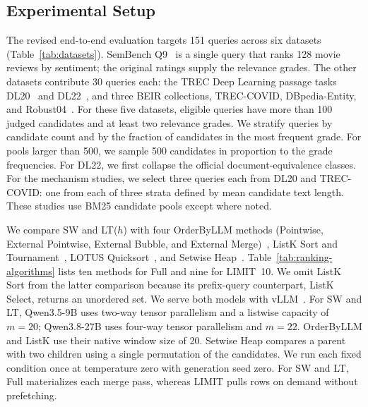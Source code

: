 \subsection{Experimental Setup}
\label{sec:exp:setup}

The revised end-to-end evaluation targets 151 queries across six datasets (Table~\ref{tab:datasets}). SemBench Q9~\cite{lao2026sembench} is a single query that ranks 128 movie reviews by sentiment; the original ratings supply the relevance grades. The other datasets contribute 30 queries each: the TREC Deep Learning passage tasks DL20~\cite{arxiv21trecdl20} and DL22~\cite{arxiv25trecdl22}, and three BEIR collections, TREC-COVID, DBpedia-Entity, and Robust04~\cite{arxiv21BEIR}.
For these five datasets, eligible queries have more than 100 judged candidates and at least two relevance grades. We stratify queries by candidate count and by the fraction of candidates in the most frequent grade. For pools larger than 500, we sample 500 candidates in proportion to the grade frequencies. For DL22, we first collapse the official document-equivalence classes.
For the mechanism studies, we select three queries each from DL20 and TREC-COVID: one from each of three strata defined by mean candidate text length. These studies use BM25 candidate pools except where noted.

We compare SW and LT($h$) with four OrderByLLM methods (Pointwise, External Pointwise, External Bubble, and External Merge)~\cite{DBLP:journals/corr/abs-2509-00303}, ListK Sort and Tournament~\cite{DBLP:journals/corr/abs-2603-17223}, LOTUS Quicksort~\cite{DBLP:journals/pvldb/PatelJPGAGZ25}, and Setwise Heap~\cite{DBLP:conf/sigir/ZhuangZKZ24}.
Table~\ref{tab:ranking-algorithms} lists ten methods for Full and nine for \textsf{LIMIT}~10. We omit ListK Sort from the latter comparison because its prefix-query counterpart, ListK Select, returns an unordered set.
We serve both models with vLLM~\cite{kwon2023efficient}. For SW and LT, Qwen3.5-9B uses two-way tensor parallelism and a listwise capacity of $m=20$; Qwen3.8-27B uses four-way tensor parallelism and $m=22$. OrderByLLM and ListK use their native window size of 20. Setwise Heap compares a parent with two children using a single permutation of the candidates.
We run each fixed condition once at temperature zero with generation seed zero. For SW and LT, Full materializes each merge pass, whereas \textsf{LIMIT} pulls rows on demand without prefetching.

